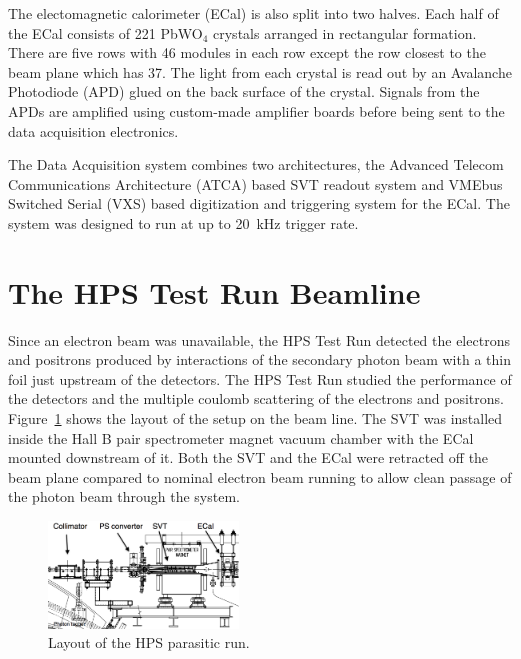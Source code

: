 \documentclass[final,3p,times,twocolumn]{elsarticle}
\begin{document}
The electomagnetic calorimeter (ECal) is also split into two halves. Each half of the ECal consists of 
221 PbWO$_4$ crystals arranged in rectangular formation. There are five rows with 46 modules in 
each row except the row closest to the beam plane which has 37. The light from each crystal 
is read out by an Avalanche Photodiode (APD) glued on the back surface of the crystal. 
Signals from the APDs are amplified using custom-made amplifier boards before being sent to the 
data acquisition electronics.

The  Data Acquisition system combines two architectures, the Advanced Telecom Communications 
Architecture (ATCA) based SVT readout system and VMEbus Switched Serial (VXS) based digitization 
and triggering system for the ECal. The system was designed to run at up to 20~kHz trigger rate.





\section{The HPS Test Run Beamline}
Since an electron beam was unavailable, the HPS Test Run detected the electrons and positrons 
produced by interactions of the secondary photon beam with a thin foil just upstream of the detectors.  
The HPS Test Run studied the performance of the detectors and the multiple coulomb scattering of the 
electrons and positrons. Figure~\ref{fig:hpstest_layout} shows the layout of 
the setup on the beam line. The SVT was installed inside the Hall B pair 
spectrometer magnet vacuum chamber with the ECal mounted downstream of it. Both the 
SVT and the ECal were retracted off the beam plane compared to nominal electron beam running to 
allow clean passage of the photon beam through the system. 
\begin{figure}[]
    \includegraphics[width=0.45\textwidth]{figures/hps-testrun-beamline-edited2}
\caption{\small{Layout of the HPS parasitic run.} }
\label{fig:hpstest_layout}
\end{figure}
\end{document}
